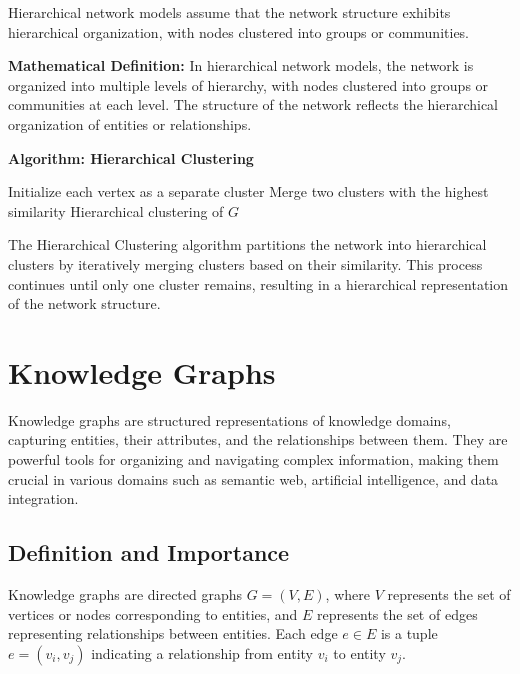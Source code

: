 \documentclass[12pt]{book} %
\begin{document}
Hierarchical network models assume that the network structure exhibits hierarchical organization, with nodes clustered into groups or communities.

\textbf{Mathematical Definition:} In hierarchical network models, the network is organized into multiple levels of hierarchy, with nodes clustered into groups or communities at each level. The structure of the network reflects the hierarchical organization of entities or relationships.

\textbf{Algorithm: Hierarchical Clustering}
\FloatBarrier
\begin{algorithm}
\caption{Hierarchical Clustering}
\begin{algorithmic}[1]
\State Initialize each vertex as a separate cluster
    \State Merge two clusters with the highest similarity
\EndWhile
\State \Return Hierarchical clustering of $G$
\EndFunction
\end{algorithmic}
\end{algorithm}
\FloatBarrier
The Hierarchical Clustering algorithm partitions the network into hierarchical clusters by iteratively merging clusters based on their similarity. This process continues until only one cluster remains, resulting in a hierarchical representation of the network structure.



\section{Knowledge Graphs}

Knowledge graphs are structured representations of knowledge domains, capturing entities, their attributes, and the relationships between them. They are powerful tools for organizing and navigating complex information, making them crucial in various domains such as semantic web, artificial intelligence, and data integration.

\subsection{Definition and Importance}

Knowledge graphs are directed graphs \(G = (V, E)\), where \(V\) represents the set of vertices or nodes corresponding to entities, and \(E\) represents the set of edges representing relationships between entities. Each edge \(e \in E\) is a tuple \(e = (v_i, v_j)\) indicating a relationship from entity \(v_i\) to entity \(v_j\).
\end{document}
